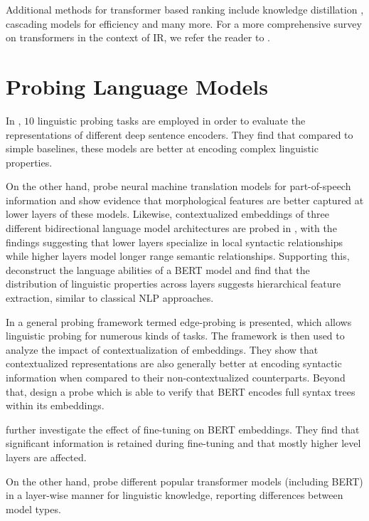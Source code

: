 Additional methods for transformer based ranking include knowledge distillation \cite{DBLP:journals/corr/abs-2009-07531, DBLP:journals/corr/abs-2010-02666}, cascading models for efficiency \cite{Nogueira2019MultiStageDR} and many more. For a more comprehensive survey on transformers in the context of IR, we refer the reader to \cite{10.1145/3437963.3441667}.

\section{Probing Language Models}
In \cite{conneau-etal-2018-cram}, $10$ linguistic probing tasks are employed in order to evaluate the representations of different deep sentence encoders. They find that compared to simple baselines, these models are better at encoding complex linguistic properties.

On the other hand, \cite{Belinkov2017WhatDN} probe neural machine translation models for part-of-speech information and show evidence that morphological features are better captured at lower layers of these models. Likewise, contextualized embeddings of three different bidirectional language model architectures are probed in \cite{peters-etal-2018-dissecting}, with the findings suggesting that lower layers specialize in local syntactic relationships while higher layers model longer range semantic relationships. Supporting this, \cite{tenney-etal-2019-bert} deconstruct the language abilities of a BERT model and find that the distribution of linguistic properties across layers suggests hierarchical feature extraction, similar to classical NLP approaches.

In \cite{Tenney2019WhatDY} a general probing framework termed edge-probing is presented, which allows linguistic probing for numerous kinds of tasks. The framework is then used to analyze the impact of contextualization of embeddings. They show that contextualized representations are also generally better at encoding syntactic information when compared to their non-contextualized counterparts. Beyond that, \cite{Hewitt2019ASP} design a probe which is able to verify that BERT encodes full syntax trees within its embeddings.

\cite{merchant-etal-2020-happens} further investigate the effect of fine-tuning on BERT embeddings. They find that significant information is retained during fine-tuning and that mostly higher level layers are affected.

On the other hand, \cite{Fayyaz2021NotAM} probe different popular transformer models (including BERT) in a layer-wise manner for linguistic knowledge, reporting differences between model types.

